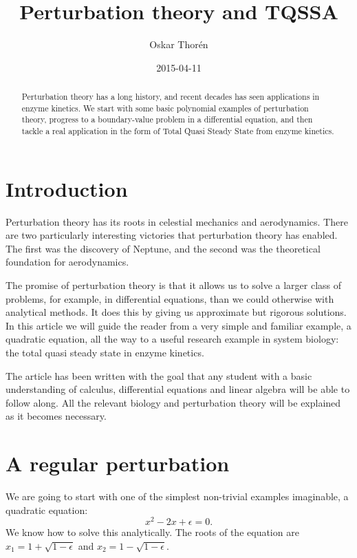 \documentclass[12pt]{article}
\title{Perturbation theory and TQSSA}
\author{Oskar Thor\'{e}n}
\date{2015-04-11}
\begin{document}
\nocite{*} %
\maketitle

\begin{abstract}
  Perturbation theory has a long history, and recent decades has seen
  applications in enzyme kinetics. We start with some basic polynomial
  examples of perturbation theory, progress to a boundary-value
  problem in a differential equation, and then tackle a real
  application in the form of Total Quasi Steady State from enzyme
  kinetics.
\end{abstract}

\clearpage
\tableofcontents
\clearpage

\section{Introduction}

Perturbation theory has its roots in celestial mechanics and
aerodynamics. There are two particularly interesting victories that
perturbation theory has enabled. The first was the discovery of
Neptune, and the second was the theoretical foundation for
aerodynamics.

The promise of perturbation theory is that it allows us to solve a
larger class of problems, for example, in differential equations, than
we could otherwise with analytical methods. It does this by giving us
approximate but rigorous solutions. In this article we will guide
the reader from a very simple and familiar example, a quadratic
equation, all the way to a useful research example in system biology:
the total quasi steady state in enzyme kinetics.

The article has been written with the goal that any student with a
basic understanding of calculus, differential equations and linear
algebra will be able to follow along. All the relevant biology and
perturbation theory will be explained as it becomes necessary.

\newpage
\section{A regular perturbation}

We are going to start with one of the simplest non-trivial examples
imaginable, a quadratic equation:
\begin{equation}
x^2 - 2x + \epsilon = 0.
\end{equation}
We know how to solve this analytically. The roots of the equation are
$x_1 = 1 + \sqrt{1 - \epsilon}$ and $x_2 = 1 - \sqrt{1 - \epsilon}$.
\end{document}

